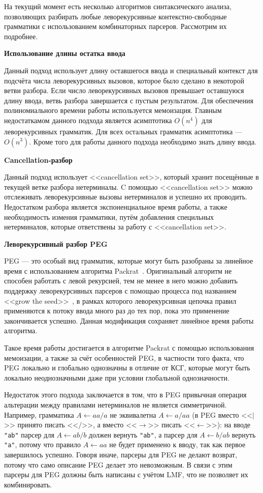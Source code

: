 \documentclass[times]{itmo-student-thesis}
\begin{document}
На текущий момент есть несколько алгоритмов синтаксического анализа, позволяющих разбирать любые леворекурсивные
контекстно-свободные грамматики с использованием комбинаторных парсеров. Рассмотрим их подробнее.

\textbf{Использование длины остатка ввода}~\cite{hudak_parser_2008}

Данный подход использует длину оставшегося ввода и специальный контекст для подсчёта числа леворекурсивных вызовов, которое
было сделано в некоторой ветви разбора. Если число леворекурсивных вызовов превышает оставшуюся длину ввода, ветвь разбора
завершается с пустым результатом. Для обеспечения полиномиального времени работы используется мемоизация. Главным недостаткамом данного 
подхода является асимптотика $O(n^4)$ для леворекурсивных грамматик. Для всех остальных грамматик асимптотика --- $O(n^3)$. Кроме
того для работы данного подхода необходимо знать длину ввода.

\textbf{Cancellation-разбор}~\cite{nederhof_new_1993}

Данный подход использует <<cancellation set>>, который хранит посещённые в текущей ветке разбора нетерминалы. C помощью <<cancellation set>>
можно отслеживать леворекурсивные вызовы нетерминалов и успешно их проводить. Недостатком разбора является экспоненциальное время работы,
а также необходимость измения грамматики, путём добавления специльных нетерминалов, которые ответствены за работу с <<cancellation set>>.

\textbf{Леворекурсивный разбор PEG}~\cite{warth_packrat_2008}

PEG --- это особый вид грамматик, которые могут быть разобраны за линейное время с использованием алгоритма
Packrat~\cite{ford_parsing_2004}. Оригинальный алгоритм не способен работать с левой рекурсией, тем не менее в него можно
добавить поддержку леворекурсивных парсеров с помощью процесса под названием <<grow the seed>>~\cite{warth_packrat_2008}, в
рамках которого леворекурсивная цепочка правил применяются к потоку ввода много раз до тех пор, пока это применение
закончивается успешно. Данная модификация сохраняет линейное время работы алгоритма. 

Такое время работы достигается в алгоритме Packrat с помощью использования мемоизации, а также за счёт особенностей
PEG, в частности того факта, что PEG локально и глобально однозначны в отличие от КСГ, которые могут быть локально
неоднозначными даже при условии глобальной однозначности.

Недостаток этого подхода заключается в том, что в PEG привычная операция альтерации между правилами нетерминалов не
является симметричной. Например, грамматика $A \leftarrow aa / a$ не эквивалетна $A \leftarrow a / aa$ (в PEG вместо
<<$|$>>{} принято писать <<$/$>>{}, а вместо <<$\to$>>{} писать <<$\leftarrow$>>):
на вводе \lstinline{"ab"} парсер для $A \leftarrow ab / b$ должен вернуть \lstinline{"ab"}, а парсер для
$A \leftarrow b / ab$ вернуть \lstinline{"a"}, потому что правило $A \leftarrow aa$ не будет применено к вводу,
так как первое завершилось успешно. Говоря иначе, парсеры для PEG не делают возврат, потому что само описание PEG делает
это невозможным. В связи с этим парсеры для PEG должны быть написаны с учётом LMF, что не позволяет их
комбинировать.
\end{document}
